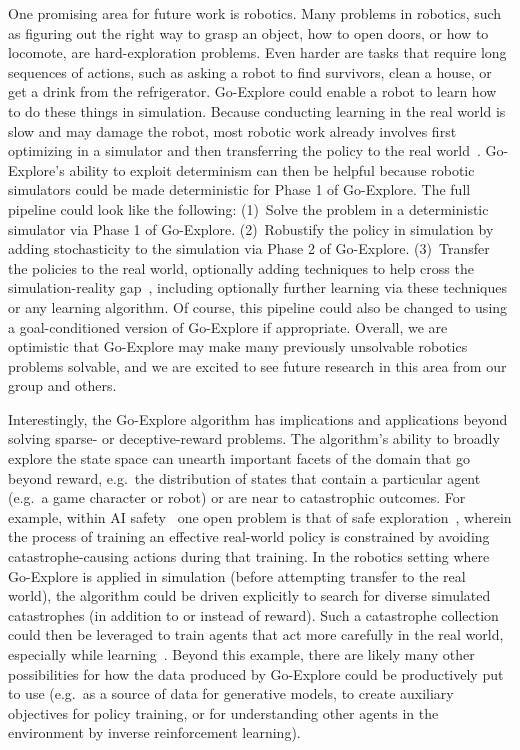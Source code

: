\documentclass{article}
\begin{document}
One promising area for future work is robotics. Many problems in robotics, such as figuring out the right way to grasp an object, how to open doors, or how to locomote, are hard-exploration problems. Even harder are tasks that require long sequences of actions, such as asking a robot to find survivors, clean a house, or get a drink from the refrigerator. Go-Explore could enable a robot to learn how to do these things in simulation. 
Because conducting learning in the real world is slow and may damage the robot, most robotic work already involves first optimizing in a simulator and then transferring the policy to the real world~\cite{cully:nature15, lee2013evolving, andrychowicz2018learning, koos2013transferability}. Go-Explore's ability to exploit determinism can then be helpful because robotic simulators could be made deterministic for Phase 1 of Go-Explore. 
The full pipeline could look like the following: (1)~Solve the problem in a deterministic simulator via Phase 1 of Go-Explore. (2)~Robustify the policy in simulation by adding stochasticity to the simulation via Phase 2 of Go-Explore. (3)~Transfer the policies to the real world, optionally adding techniques to help cross the simulation-reality gap~\cite{cully:nature15, andrychowicz2018learning, koos2013transferability}, including optionally further learning via these techniques or any learning algorithm. Of course, this pipeline could also be changed to using a goal-conditioned version of Go-Explore if appropriate. Overall, we are optimistic that Go-Explore may make many previously unsolvable robotics problems solvable, and we are excited to see future research in this area from our group and others. 

Interestingly, the Go-Explore algorithm has implications and applications beyond solving sparse- or deceptive-reward problems. The algorithm's ability to broadly explore the state space can unearth important facets of the domain that go beyond reward, e.g.\ the distribution of states that contain a particular agent (e.g.\ a game character or robot) or are near to catastrophic outcomes. For example, within AI safety~\cite{Amodei2016ConcretePI} one open problem is that of safe exploration~\cite{garcia2015comprehensive}, wherein the process of training an effective real-world policy is constrained by avoiding catastrophe-causing actions during that training. In the robotics setting where Go-Explore is applied in simulation (before attempting transfer to the real world), the algorithm could be driven explicitly to search for diverse simulated catastrophes (in addition to or instead of reward). Such a catastrophe collection could then be leveraged to train agents that act more carefully in the real world, especially while learning~\cite{lipton2016combating,saunders2018trial}. Beyond this example, there are likely many other possibilities for how the data produced by Go-Explore could be productively put to use (e.g.\ as a source of data for generative models, to create auxiliary objectives for policy training, or for understanding other agents in the environment by inverse reinforcement learning).
\end{document}

